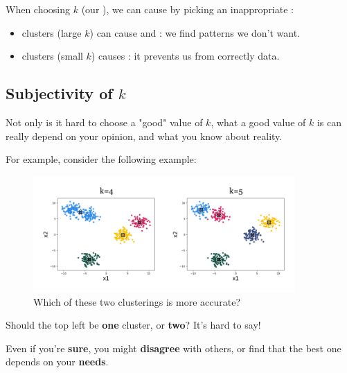         \begin{concept}
            When choosing $k$ (our ), we can cause  by picking an inappropriate :
            
            \begin{itemize}
                \item {} clusters (large $k$) can cause  and : we find patterns we don't want.
                
                \item {} clusters (small $k$) causes : it prevents us from correctly  data.
            \end{itemize}
        \end{concept}
        
    \subsection*{Subjectivity of $k$}
    
        Not only is it hard to choose a "good" value of $k$, what a good value of $k$ is can really depend on your opinion, and what you know about reality.
        
        For example, consider the following example:
        
        \begin{figure}[H]
            \centering
            \includegraphics[width=100mm,scale=0.4]{images/clustering_images/subjective_k_value.png}
            \caption*{Which of these two clusterings is more accurate?}
        \end{figure}
        
        Should the top left be \textbf{one} cluster, or \textbf{two}? It's hard to say!
        
        Even if you're \textbf{sure}, you might \textbf{disagree} with others, or find that the best one depends on your \textbf{needs}.
        
